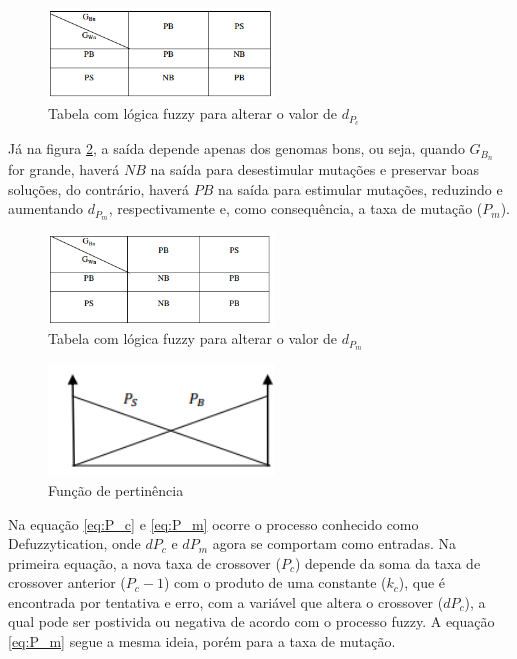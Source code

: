 \documentclass[conference]{IEEEtran}
\begin{document}
\begin{figure}[ht]
\centering
\includegraphics[width=6cm]{fuzzy_fig2.png}
\caption{\label{img:fuzzy_fig2}Tabela com lógica fuzzy para alterar o valor de $d_P_c$} 
\end{figure}

Já na figura \ref{img:fuzzy_fig3}, a saída depende apenas dos genomas bons, ou seja, quando  $G_B_n$ for grande, haverá $NB$ na saída para desestimular mutações e preservar boas soluções, do contrário, haverá $PB$  na saída para estimular mutações, reduzindo e aumentando $d_P_m$, respectivamente e, como consequência, a taxa de mutação ($P_m$). 
\begin{figure}[ht]
\centering
\includegraphics[width=6cm]{fuzzy_fig3.png}
\caption{\label{img:fuzzy_fig3}Tabela com lógica fuzzy para alterar o valor de $d_P_m$} 
\end{figure}

\begin{figure}[ht]
\centering
\includegraphics[width=6cm]{fuzzy_pertinencia.png}
\caption{\label{img:fuzzy_pertinencia} Função de pertinência} 
\end{figure}

Na equação \ref{eq:P_c} e \ref{eq:P_m} ocorre o processo conhecido como Defuzzytication, onde $dP_c$ e $dP_m$ agora se comportam como entradas. Na primeira equação, a nova taxa de crossover ($P_c$) depende da soma da taxa de crossover anterior ($P_c-1$) com o produto de uma constante ($k_c$), que é encontrada por tentativa e erro, com a variável que altera o crossover ($dP_c$), a qual pode ser postivida ou negativa de acordo com o processo fuzzy. A equação \ref{eq:P_m} segue a mesma ideia, porém para a taxa de mutação.
\end{document}

